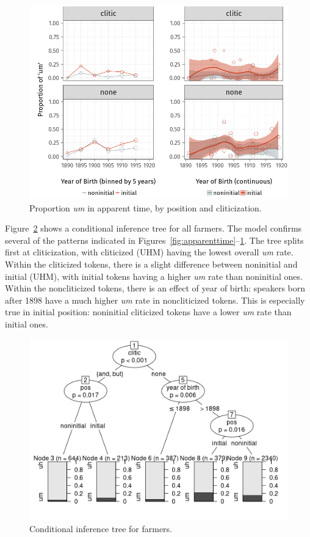 \documentclass[11pt]{article}
\begin{document}
\begin{figure}[htpb]
    \centering
    \includegraphics[width=0.8\linewidth]{figures/apparentclitic.png}
    \caption{Proportion \emph{um} in apparent time, by position and
    cliticization.}
    \label{fig:apparentclitic}
\end{figure}

Figure~\ref{fig:farmertree} shows a conditional inference tree for all farmers.
The model confirms several of the patterns indicated in
Figures~\ref{fig:apparenttime}--\ref{fig:apparentclitic}.
The tree splits first at cliticization, with cliticized (UHM) having the lowest
overall \emph{um} rate.
Within the cliticized tokens, there is a slight difference between noninitial
and initial (UHM), with initial tokens having a higher \emph{um} rate than
noninitial ones.
Within the noncliticized tokens, there is an effect of year of birth:
speakers born after 1898 have a much higher \emph{um} rate in noncliticized
tokens.
This is especially true in initial position:
noninitial cliticized tokens have a lower \emph{um} rate than initial ones.

\begin{figure}[htpb]
    \centering
    \includegraphics[width=0.8\linewidth]{figures/ctreefarmers.png}
    \caption{Conditional inference tree for farmers.}
    \label{fig:farmertree}
\end{figure}
\end{document}
